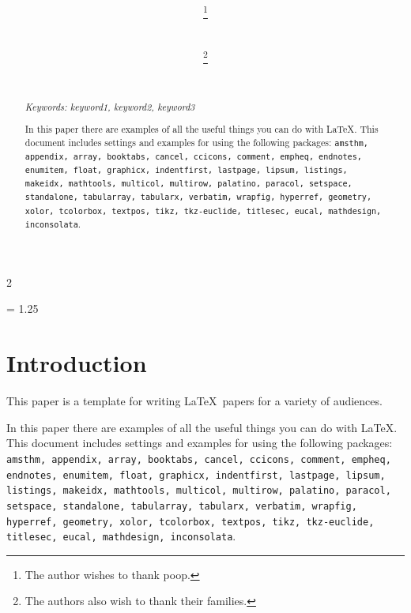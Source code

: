 \documentclass[11pt]{article}%
\title{{\bf \doctitle}}%
\author{\docauthortwo \thanks{The author wishes to thank poop.} \\ \docorgtwo \\ \small{\lemail{\docemailtwo}}
 \and%
 \docauthor \thanks{The authors also wish to thank their families.} \\ \docorg \\ \small{\lemail{\docemail}}}%
\date{} %
\begin{document}
\maketitle

\begin{multicols*}{2}
\begin{abstract}


{\em Keywords: keyword1, keyword2, keyword3 %

In this paper there are examples of all the useful things you can do
with \LaTeX. This document includes settings and examples for using
the following packages: {\tt amsthm, appendix, array, booktabs, cancel, ccicons, comment, empheq, endnotes, enumitem, float, graphicx, indentfirst, lastpage, lipsum, listings, makeidx, mathtools, multicol, multirow, palatino, paracol, setspace, standalone, tabularray, tabularx, verbatim, wrapfig, hyperref, geometry, xolor, tcolorbox, textpos, tikz, tkz-euclide, titlesec, eucal, mathdesign, inconsolata}.

}

\end{abstract}


\baselineskip = 1.25\baselineskip %

\section{Introduction}
\label{Introduction}

This paper is a template for writing \LaTeX\ papers for a variety of
audiences.


In this paper there are examples of all the useful things you can do
with \LaTeX. This document includes settings and examples for using
the following packages: {\tt amsthm, appendix, array, booktabs, cancel, ccicons, comment, empheq, endnotes, enumitem, float, graphicx, indentfirst, lastpage, lipsum, listings, makeidx, mathtools, multicol, multirow, palatino, paracol, setspace, standalone, tabularray, tabularx, verbatim, wrapfig, hyperref, geometry, xolor, tcolorbox, textpos, tikz, tkz-euclide, titlesec, eucal, mathdesign, inconsolata}.

\lipsum[1]


\end{multicols*}
\end{document}
